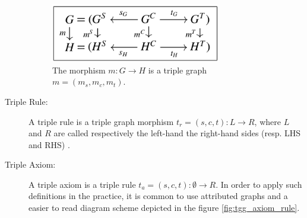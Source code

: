 \documentclass[tuberlin,cic,tc,english,noabntcite]{iiufrgs}
\begin{document}
\begin{description}
	\begin{figure}[h]
	    \caption{The morphism $m: G \rightarrow H$ is a triple graph $m = (m_s,m_c,m_t)$.}
	    \begin{center}
	        \includegraphics[width=20em]{tg_morphism}   
	    \end{center}
	    \label{fig:tg_morphism}
	\end{figure}

	\item[Triple Rule:] A triple rule is a triple graph morphism $t_r = (s, c, t) : L \rightarrow R$, where $L$ and $R$ are called respectively the left-hand the right-hand sides (resp. LHS and RHS) \citep{ehrig2007information}.
	
	\item[Triple Axiom:] A triple axiom is a triple rule $t_a = (s, c, t) : \emptyset \rightarrow R$. In order to apply such definitions in the practice, it is common to use attributed graphs and a easier to read diagram scheme depicted in the figure \ref{fig:tgg_axiom_rule}.



\end{description}
\end{document}
